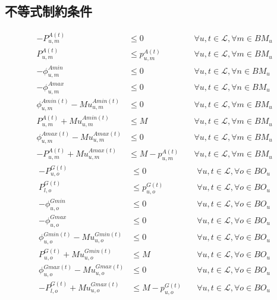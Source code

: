\documentclass[a4j,10.5pt]{jarticle}
\begin{document}
\subsection{不等式制約条件}
\begin{align}
-P_{u,m}^{A(t)}&\le 0&\quad \forall u,t\in\mathcal{L},\forall m\in BM_u \tag{m-1}\\
P_{u,m}^{A(t)}&\le p_{u,m}^{A(t)}&\quad \forall u,t\in\mathcal{L},\forall m\in BM_u \tag{m-2}\\
 -\phi_{u,m}^{Amin}&\le 0&\quad \forall u,t\in\mathcal{L},\forall n\in BM_u  \tag{m-3}\\
 -\phi_{u,m}^{Amax}&\le 0&\quad \forall u,t\in\mathcal{L},\forall n\in BM_u  \tag{m-4}\\
\phi_{u,m}^{Amin(t)} - Mu^{Amin(t)}_{u,m} &\le0&\quad \forall u,t\in\mathcal{L},\forall m\in BM_u  \tag{m-5}\\
P_{u,m}^{A(t)}+Mu^{Amin(t)}_{u,m} &\le M&\quad \forall u,t\in\mathcal{L},\forall m\in BM_u \tag{m-6}\\
\phi_{u,m}^{Amax(t)}-Mu^{Amax(t)}_{u,m}&\le0&\quad \forall u,t\in\mathcal{L},\forall m\in BM_u \tag{m-7}\\
-P_{u,m}^{A(t)}+Mu^{Amax(t)}_{u ,m}&\le M-p_{u,m}^{A(t)}&\quad \forall u,t\in\mathcal{L},\forall m\in BM_u \tag{m-8}
\end{align}
\begin{align}
-P_{u,o}^{G(t)}&\le 0&\quad \forall u,t\in\mathcal{L},\forall o\in BO_u \tag{o-1}\\
P_{l,o}^{G(t)}&\le p_{u,o}^{G(t)}&\quad \forall u,t\in\mathcal{L},\forall o\in BO_u \tag{o-2}\\
 -\phi_{u,o}^{Gmin}&\le 0&\quad \forall u,t\in\mathcal{L},\forall o\in BO_u  \tag{o-3}\\
 -\phi_{u,o}^{Gmax}&\le 0&\quad \forall u,t\in\mathcal{L},\forall o\in BO_u  \tag{o-4}\\
 \phi_{u,o}^{Gmin(t)} - Mu^{Gmin(t)}_{u,o} &\le0&\quad \forall u,t\in\mathcal{L},\forall o\in BO_u \tag{o-5}\\
P_{u,o}^{G(t)}+Mu^{Gmin(t)}_{u,o} &\le M&\quad \forall u,t\in\mathcal{L},\forall o\in BO_u \tag{o-6}\\
\phi_{u,o}^{Gmax(t)}-Mu^{Gmax(t)}_{u,o}&\le0&\quad \forall u,t\in\mathcal{L},\forall o\in BO_u \tag{o-7}\\
-P_{l,o}^{G(t)}+Mu^{Gmax(t)}_{u,o}&\le M-p_{u,o}^{G(t)}&\quad \forall u,t\in\mathcal{L},\forall o\in BO_u \tag{o-8}
\end{align}
\end{document}
